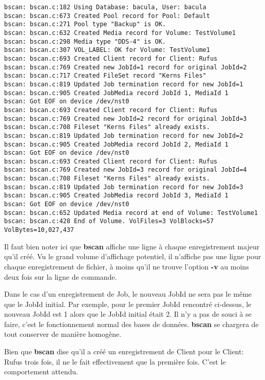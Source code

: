 \footnotesize
\begin{verbatim}
bscan: bscan.c:182 Using Database: bacula, User: bacula
bscan: bscan.c:673 Created Pool record for Pool: Default
bscan: bscan.c:271 Pool type "Backup" is OK.
bscan: bscan.c:632 Created Media record for Volume: TestVolume1
bscan: bscan.c:298 Media type "DDS-4" is OK.
bscan: bscan.c:307 VOL_LABEL: OK for Volume: TestVolume1
bscan: bscan.c:693 Created Client record for Client: Rufus
bscan: bscan.c:769 Created new JobId=1 record for original JobId=2
bscan: bscan.c:717 Created FileSet record "Kerns Files"
bscan: bscan.c:819 Updated Job termination record for new JobId=1
bscan: bscan.c:905 Created JobMedia record JobId 1, MediaId 1
bscan: Got EOF on device /dev/nst0
bscan: bscan.c:693 Created Client record for Client: Rufus
bscan: bscan.c:769 Created new JobId=2 record for original JobId=3
bscan: bscan.c:708 Fileset "Kerns Files" already exists.
bscan: bscan.c:819 Updated Job termination record for new JobId=2
bscan: bscan.c:905 Created JobMedia record JobId 2, MediaId 1
bscan: Got EOF on device /dev/nst0
bscan: bscan.c:693 Created Client record for Client: Rufus
bscan: bscan.c:769 Created new JobId=3 record for original JobId=4
bscan: bscan.c:708 Fileset "Kerns Files" already exists.
bscan: bscan.c:819 Updated Job termination record for new JobId=3
bscan: bscan.c:905 Created JobMedia record JobId 3, MediaId 1
bscan: Got EOF on device /dev/nst0
bscan: bscan.c:652 Updated Media record at end of Volume: TestVolume1
bscan: bscan.c:428 End of Volume. VolFiles=3 VolBlocks=57 VolBytes=10,027,437
\end{verbatim}
\normalsize

Il faut bien noter ici que {\bf bscan} affiche une ligne à chaque enregistrement
majeur qu'il créé. Vu le grand volume d'affichage potentiel, il n'affiche pas
une ligne pour chaque enregistrement de fichier, à moins qu'il ne trouve 
l'option {\bf -v} au moins deux fois sur la ligne de commande. 


Dans le cas d'un enregistrement de Job, le nouveau JobId ne sera pas le même
que le JobId initial. Par exemple, pour le premier JobId rencontré ci-dessus, 
le nouveau JobId est 1 alors que le JobId initial était 2. Il n'y a pas de souci
à se faire, c'est le fonctionnement normal des bases de données. {\bf bscan} se
chargera de tout conserver de manière homogène.

Bien que {\bf bscan} dise qu'il a créé un enregistrement de Client pour le 
Client: Rufus trois fois, il ne le fait effectivement que la première fois. 
C'est le comportement attendu.

